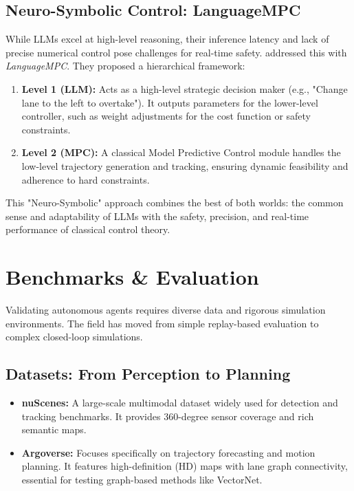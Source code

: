 \documentclass[12pt, a4paper]{article}
\begin{document}
\subsection{Neuro-Symbolic Control: LanguageMPC}
While LLMs excel at high-level reasoning, their inference latency and lack of precise numerical control pose challenges for real-time safety. \cite{sha2023languagempc} addressed this with \textit{LanguageMPC}. They proposed a hierarchical framework:
\begin{enumerate}
    \item \textbf{Level 1 (LLM):} Acts as a high-level strategic decision maker (e.g., "Change lane to the left to overtake"). It outputs parameters for the lower-level controller, such as weight adjustments for the cost function or safety constraints.
    \item \textbf{Level 2 (MPC):} A classical Model Predictive Control module handles the low-level trajectory generation and tracking, ensuring dynamic feasibility and adherence to hard constraints.
\end{enumerate}
This "Neuro-Symbolic" approach combines the best of both worlds: the common sense and adaptability of LLMs with the safety, precision, and real-time performance of classical control theory.

\section{Benchmarks \& Evaluation}
\label{sec:benchmarks}

Validating autonomous agents requires diverse data and rigorous simulation environments. The field has moved from simple replay-based evaluation to complex closed-loop simulations.

\subsection{Datasets: From Perception to Planning}
\begin{itemize}
    \item \textbf{nuScenes:} A large-scale multimodal dataset widely used for detection and tracking benchmarks. It provides 360-degree sensor coverage and rich semantic maps.
    \item \textbf{Argoverse:} Focuses specifically on trajectory forecasting and motion planning. It features high-definition (HD) maps with lane graph connectivity, essential for testing graph-based methods like VectorNet.
\end{itemize}
\end{document}
